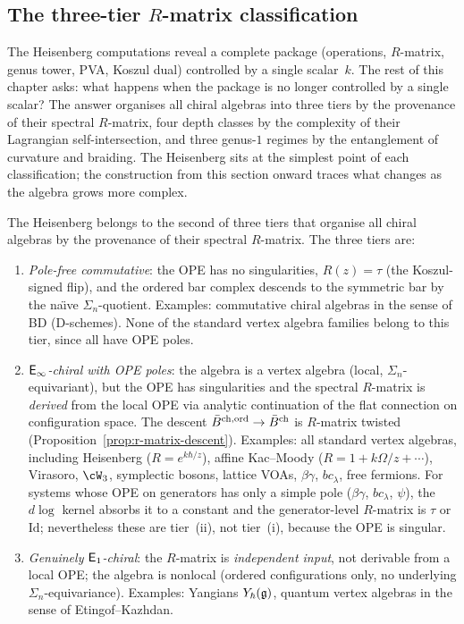 \subsection{The three-tier $R$-matrix classification}
\label{subsec:ordered-three-tier}

The Heisenberg computations reveal a complete package (operations, $R$-matrix, genus tower, PVA, Koszul dual) controlled
by a single scalar~$k$. The rest of this chapter asks: what
happens when the package is no longer controlled by a single scalar?
The answer organises all chiral algebras into three tiers by the
provenance of their spectral $R$-matrix, four depth classes by the
complexity of their Lagrangian self-intersection, and three
genus-$1$ regimes by the entanglement of curvature and braiding.
The Heisenberg sits at the simplest point of each classification;
the construction from this section onward traces
what changes as the algebra grows more complex.

The Heisenberg belongs to the second of three tiers that
organise all chiral algebras by the provenance of their spectral
$R$-matrix. The three tiers are:
\begin{enumerate}[label=\textup{(\roman*)}]
\item \emph{Pole-free commutative}:
 the OPE has no singularities, $R(z) = \tau$
 (the Koszul-signed flip), and the ordered bar complex
 descends to the symmetric bar by the na\"{\i}ve
 $\Sigma_n$-quotient.
 Examples: commutative chiral algebras in the sense of BD
 (D-schemes). None of the standard vertex algebra families
 belong to this tier, since all have OPE poles.

\item \emph{$\mathsf{E}_{\infty}$-chiral with OPE poles}:
 the algebra is a vertex algebra (local, $\Sigma_n$-equivariant),
 but the OPE has singularities and the spectral $R$-matrix is
 \emph{derived} from the local OPE via analytic continuation
 of the flat connection on configuration space.
 The descent $\bar{B}^{\mathrm{ch,ord}} \to \bar{B}^{\mathrm{ch}}$ is
 $R$-matrix twisted (Proposition~\ref{prop:r-matrix-descent}).
 Examples: all standard vertex algebras,
 including Heisenberg ($R = e^{k\hbar/z}$), affine Kac--Moody
 ($R = 1 + k\Omega/z + \cdots$), Virasoro, $\cW_3$, symplectic
 bosons, lattice VOAs, $\beta\gamma$, $bc_\lambda$,
 free fermions. For systems whose OPE on generators
 has only a simple pole ($\beta\gamma$, $bc_\lambda$, $\psi$),
 the $d\log$ kernel absorbs it to a constant and the
 generator-level $R$-matrix is $\tau$ or $\mathrm{Id}$;
 nevertheless these are tier~(ii), not tier~(i),
 because the OPE is singular.

\item \emph{Genuinely $\mathsf{E}_1$-chiral}:
 the $R$-matrix is \emph{independent input}, not derivable
 from a local OPE; the algebra is nonlocal (ordered configurations
 only, no underlying $\Sigma_n$-equivariance).
 Examples: Yangians $Y_\hbar(\mathfrak{g})$, quantum vertex algebras
 in the sense of Etingof--Kazhdan.
\end{enumerate}

